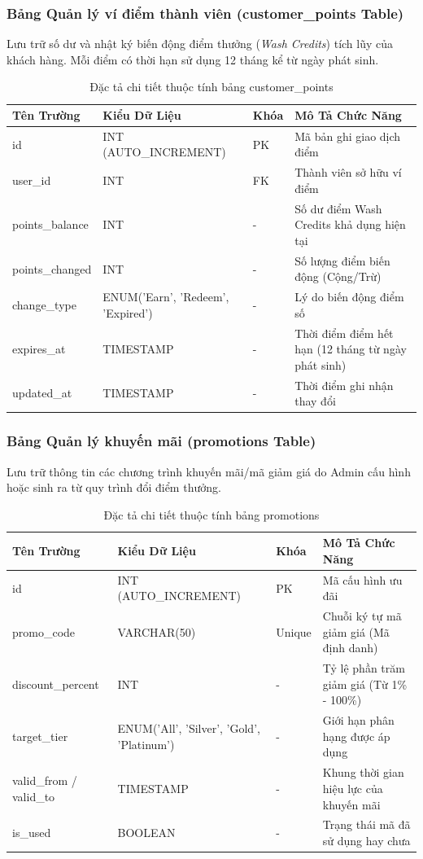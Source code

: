 \subsubsection{Bảng Quản lý ví điểm thành viên (customer\_points Table)}
Lưu trữ số dư và nhật ký biến động điểm thưởng (\textit{Wash Credits}) tích lũy của khách hàng. Mỗi điểm có thời hạn sử dụng 12 tháng kể từ ngày phát sinh.
\begin{table}[htbp]
\centering
\caption{Đặc tả chi tiết thuộc tính bảng customer\_points}
\label{tab:points_schema}
\small
\begin{tabular}{p{2.9cm}p{4.2cm}p{1.3cm}p{4.9cm}}
\toprule
\textbf{Tên Trường} & \textbf{Kiểu Dữ Liệu} & \textbf{Khóa} & \textbf{Mô Tả Chức Năng} \\
\midrule
id & INT (AUTO\_INCREMENT) & PK & Mã bản ghi giao dịch điểm \\
user\_id & INT & FK & Thành viên sở hữu ví điểm \\
points\_balance & INT & - & Số dư điểm Wash Credits khả dụng hiện tại \\
points\_changed & INT & - & Số lượng điểm biến động (Cộng/Trừ) \\
change\_type & ENUM('Earn', 'Redeem', 'Expired') & - & Lý do biến động điểm số \\
expires\_at & TIMESTAMP & - & Thời điểm điểm hết hạn (12 tháng từ ngày phát sinh) \\
updated\_at & TIMESTAMP & - & Thời điểm ghi nhận thay đổi \\
\bottomrule
\end{tabular}
\end{table}

\subsubsection{Bảng Quản lý khuyến mãi (promotions Table)}
Lưu trữ thông tin các chương trình khuyến mãi/mã giảm giá do Admin cấu hình hoặc sinh ra từ quy trình đổi điểm thưởng.
\begin{table}[htbp]
\centering
\caption{Đặc tả chi tiết thuộc tính bảng promotions}
\label{tab:promotions_schema}
\small
\begin{tabular}{p{2.9cm}p{4.2cm}p{1.3cm}p{4.9cm}}
\toprule
\textbf{Tên Trường} & \textbf{Kiểu Dữ Liệu} & \textbf{Khóa} & \textbf{Mô Tả Chức Năng} \\
\midrule
id & INT (AUTO\_INCREMENT) & PK & Mã cấu hình ưu đãi \\
promo\_code & VARCHAR(50) & Unique & Chuỗi ký tự mã giảm giá (Mã định danh) \\
discount\_percent & INT & - & Tỷ lệ phần trăm giảm giá (Từ 1\% - 100\%) \\
target\_tier & ENUM('All', 'Silver', 'Gold', 'Platinum') & - & Giới hạn phân hạng được áp dụng \\
valid\_from / valid\_to & TIMESTAMP & - & Khung thời gian hiệu lực của khuyến mãi \\
is\_used & BOOLEAN & - & Trạng thái mã đã sử dụng hay chưa \\
\bottomrule
\end{tabular}
\end{table}

